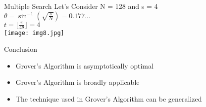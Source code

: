 \documentclass[12pt]{beamer}
\begin{document}
\begin{frame}{Multiple Search}
Let's Consider N = 128 and s = 4\\
\hspace{2cm}
$\theta = \sin^{-1}(\sqrt{\frac{s}{N}}) = 0.177...$\\
$ t = \lfloor \frac{\pi}{4\theta} \rfloor = 4$\\
\texttt{[image: img8.jpg]} 
\end{frame}
\begin{frame}{Conclusion}
\begin{itemize}
\item Grover's Algorithm is asymptotically optimal
\vspace{1cm}
\item Grover's Algorithm is broadly applicable 
\vspace{1cm}
\item The technique used in Grover's Algorithm can be generalized 
\end{itemize}
\end{frame}
\end{document}
